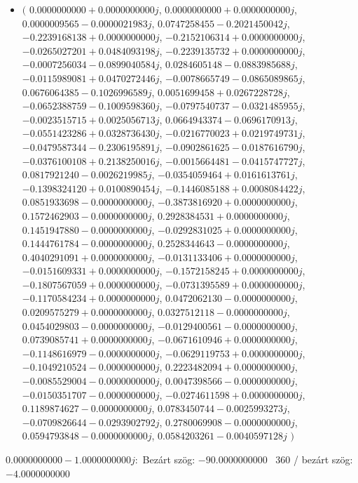 \documentclass[14pt,a4paper]{article}
\begin{document}
\begin{itemize}
\item
$\big($
$0.0000000000+0.0000000000j$, $0.0000000000+0.0000000000j$, $0.0000009565-0.0000021983j$, $0.0747258455-0.2021450042j$, $-0.2239168138+0.0000000000j$, $-0.2152106314+0.0000000000j$, $-0.0265027201+0.0484093198j$, $-0.2239135732+0.0000000000j$, $-0.0007256034-0.0899040584j$, $0.0284605148-0.0883985688j$, $-0.0115989081+0.0470272446j$, $-0.0078665749-0.0865089865j$, $0.0676064385-0.1026996589j$, $0.0051699458+0.0267228728j$, $-0.0652388759-0.1009598360j$, $-0.0797540737-0.0321485955j$, $-0.0023515715+0.0025056713j$, $0.0664943374-0.0696170913j$, $-0.0551423286+0.0328736430j$, $-0.0216770023+0.0219749731j$, $-0.0479587344-0.2306195891j$, $-0.0902861625-0.0187616790j$, $-0.0376100108+0.2138250016j$, $-0.0015664481-0.0415747727j$, $0.0817921240-0.0026219985j$, $-0.0354059464+0.0161613761j$, $-0.1398324120+0.0100890454j$, $-0.1446085188+0.0008084422j$, $0.0851933698-0.0000000000j$, $-0.3873816920+0.0000000000j$, $0.1572462903-0.0000000000j$, $0.2928384531+0.0000000000j$, $0.1451947880-0.0000000000j$, $-0.0292831025+0.0000000000j$, $0.1444761784-0.0000000000j$, $0.2528344643-0.0000000000j$, $0.4040291091+0.0000000000j$, $-0.0131133406+0.0000000000j$, $-0.0151609331+0.0000000000j$, $-0.1572158245+0.0000000000j$, $-0.1807567059+0.0000000000j$, $-0.0731395589+0.0000000000j$, $-0.1170584234+0.0000000000j$, $0.0472062130-0.0000000000j$, $0.0209575279+0.0000000000j$, $0.0327512118-0.0000000000j$, $0.0454029803-0.0000000000j$, $-0.0129400561-0.0000000000j$, $0.0739085741+0.0000000000j$, $-0.0671610946+0.0000000000j$, $-0.1148616979-0.0000000000j$, $-0.0629119753+0.0000000000j$, $-0.1049210524-0.0000000000j$, $0.2223482094+0.0000000000j$, $-0.0085529004-0.0000000000j$, $0.0047398566-0.0000000000j$, $-0.0150351707-0.0000000000j$, $-0.0274611598+0.0000000000j$, $0.1189874627-0.0000000000j$, $0.0783450744-0.0025993273j$, $-0.0709826644-0.0293902792j$, $0.2780069908-0.0000000000j$, $0.0594793848-0.0000000000j$, $0.0584203261-0.0040597128j$
$\big)$
\end{itemize}
$0.0000000000-1.0000000000j$:\
Bezárt szög: $-90.0000000000$ \
360 / bezárt szög: $-4.0000000000$\
\end{document}
